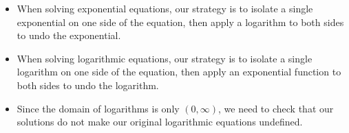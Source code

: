 \documentclass[nooutcomes]{ximera}
\begin{document}
\begin{summary}

\begin{itemize}
\item When solving exponential equations, our strategy is to isolate a single exponential on one side of the equation, then apply a logarithm to both sides to undo the exponential. 

\item When solving logarithmic equations, our strategy is to isolate a single logarithm on one side of the equation, then apply an exponential function to both sides to undo the logarithm.

\item Since the domain of logarithms is only $(0, \infty)$, we need to check that our solutions do not make our original logarithmic equations undefined.  
\end{itemize}\end{summary}
\end{document}
